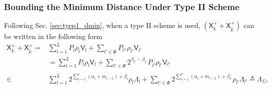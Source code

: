 \documentclass[12pt, draftclsnofoot, onecolumn]{IEEEtran}
\newcommand{\msf}[1]{\mathsf{#1}}
\theoremstyle{definition}
\begin{document}
\subsubsection{Bounding the Minimum Distance Under Type II Scheme}\label{sec:type2_dmin}
Following Sec. \ref{sec:tyep1_dmin}, when a type II scheme is used, $(\msf{X}^{+}_k+\msf{X}^{+}_{\bar{k}})$ can be written in the following form
\begin{subequations}\label{eq:type2_XA}
\begin{align}
\msf{X}^{+}_k+\msf{X}^{+}_{\bar{k}}=& \sum_{l=1}^LP_l\rho_l\msf{V}_l+\sum_{l' \in \Phi}P_{l''}\rho_{l'}\msf{V}_{l'} \nonumber \\
&= \sum_{l=1}^LP_l\rho_l\msf{V}_l+\sum_{l' \in \Phi}2^{\beta_{l'}-\beta_{\bar{l'}}}P_{\bar{l'}}\rho_{l'}\msf{V}_{l'} \label{eq:type2_XA_temp1} \\
\in& \sum_{l=1}^L 2^{\sum_{i=1}^l(\alpha_i+m_{i-1})+\beta_l}\rho_l \Lambda_l
+\sum_{l' \in \Phi}2^{\sum_{i=1}^{\bar{l'}}(\alpha_i+m_{i-1})+\beta_{l'}}\rho_{l'}\Lambda_{l'}\triangleq \Lambda_{\Sigma},
\end{align}
\end{subequations}
\end{document}
